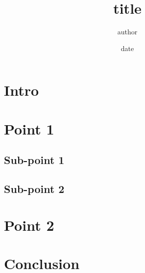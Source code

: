 \documentclass{ec}
\begin{document}
\title{title}
\author{author}
\date{date}

\maketitle
\thesis{}
\tableofcontents

\section{Intro}
\section{Point 1}
\subsection{Sub-point 1}
\subsection{Sub-point 2}
\section{Point 2}
\section{Conclusion}
\end{document}
